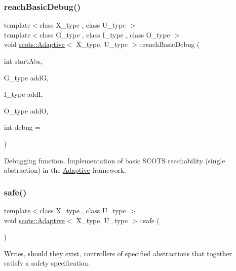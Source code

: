 \subsubsection{\texorpdfstring{reach\+Basic\+Debug()}{reachBasicDebug()}}
{\footnotesize\ttfamily template$<$class X\+\_\+type , class U\+\_\+type $>$ \\
template$<$class G\+\_\+type , class I\+\_\+type , class O\+\_\+type $>$ \\
void \hyperlink{classscots_1_1Adaptive}{scots\+::\+Adaptive}$<$ X\+\_\+type, U\+\_\+type $>$\+::reach\+Basic\+Debug (\begin{DoxyParamCaption}\item[{int}]{start\+Abs,  }\item[{G\+\_\+type}]{addG,  }\item[{I\+\_\+type}]{addI,  }\item[{O\+\_\+type}]{addO,  }\item[{int}]{debug = {} }\end{DoxyParamCaption})\hspace{0.3cm}{\ttfamily [inline]}}

Debugging function. Implementation of basic S\+C\+O\+TS reachability (single abstraction) in the \hyperlink{classscots_1_1Adaptive}{Adaptive} framework. \mbox{\label{classscots_1_1Adaptive_a76d026d45bd794eba3ef69c18835dd54}} 
\subsubsection{\texorpdfstring{safe()}{safe()}}
{\footnotesize\ttfamily template$<$class X\+\_\+type , class U\+\_\+type $>$ \\
void \hyperlink{classscots_1_1Adaptive}{scots\+::\+Adaptive}$<$ X\+\_\+type, U\+\_\+type $>$\+::safe (\begin{DoxyParamCaption}{ }\end{DoxyParamCaption})\hspace{0.3cm}{\ttfamily [inline]}}

Writes, should they exist, controllers of specified abstractions that together satisfy a safety specification. \mbox{\label{classscots_1_1Adaptive_a1c7b5c07621e61b846b70e949b92b0b7}} 
